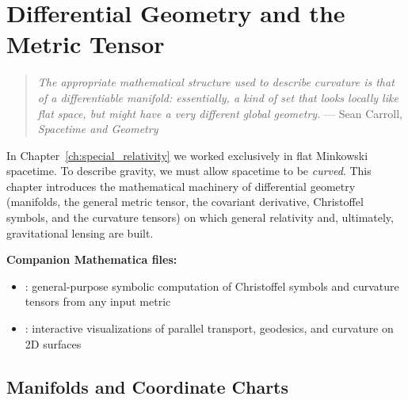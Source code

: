 
\chapter{Differential Geometry and the Metric Tensor}
\label{ch:differential_geometry}

\begin{quote}
\textit{The appropriate mathematical structure used to describe curvature is
that of a differentiable manifold: essentially, a kind of set that looks
locally like flat space, but might have a very different global geometry.}
\hfill --- Sean Carroll, \textit{Spacetime and Geometry}
\end{quote}

\noindent
In Chapter~\ref{ch:special_relativity} we worked exclusively in flat Minkowski spacetime.  To
describe gravity, we must allow spacetime to be \emph{curved}.  This
chapter introduces the mathematical machinery of differential geometry
(manifolds, the general metric tensor, the covariant derivative,
Christoffel symbols, and the curvature tensors) on which general
relativity and, ultimately, gravitational lensing are built.

\medskip
\noindent
\textbf{Companion Mathematica files:}
\begin{itemize}[nosep]
    \item {}:
          general-purpose symbolic computation of Christoffel symbols
          and curvature tensors from any input metric
    \item {}:
          interactive visualizations of parallel transport, geodesics,
          and curvature on 2D surfaces
\end{itemize}

\section{Manifolds and Coordinate Charts}
\label{sec:manifolds}

